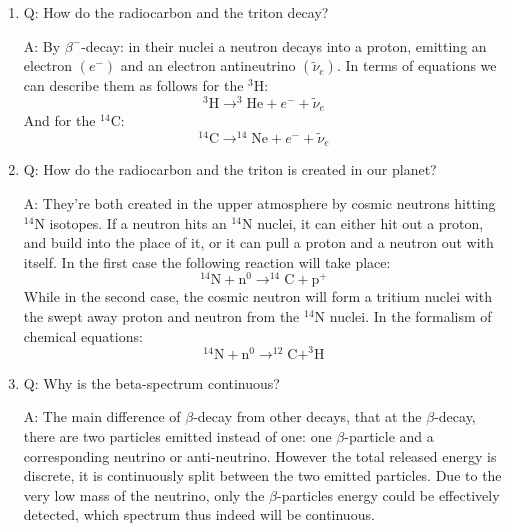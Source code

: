 \begin{enumerate}
    \item Q: How do the radiocarbon and the triton decay?
    \begin{displayquote}
        A: By $\beta^{-}$-decay: in their nuclei a neutron decays into a proton, emitting an electron $\left( e^{-} \right)$ and an electron antineutrino $\left( \tilde{\nu}_{e} \right)$. In terms of equations we can describe them  as follows for the $^{3}$H:
        \begin{equation}
        ^{3}\text{H} \to ^{3}\text{He} + e^{-} + \tilde{\nu}_{e}
        \end{equation}
And for the $^{14}$C:
		\begin{equation}
		^{14}\text{C} \to ^{14}\text{Ne} + e^{-} + \tilde{\nu}_{e}
		\end{equation}
    \end{displayquote}
    
    \item Q: How do the radiocarbon and the triton is created in our planet?
    \begin{displayquote}
        A: They're both created in the upper atmosphere by cosmic neutrons hitting $^{14}$N isotopes. If a neutron hits an $^{14}$N nuclei, it can either hit out a proton, and build into the place of it, or it can pull a proton and a neutron out with itself. In the first case the following reaction will take place:
        \begin{equation}
        ^{14}\text{N} + \text{n}^{0} \to ^{14}\text{C} + \text{p}^{+}
        \end{equation}
While in the second case, the cosmic neutron will form a tritium nuclei with the swept away proton and neutron from the $^{14}$N nuclei. In the formalism of chemical equations:
		\begin{equation}
		^{14}\text{N} + \text{n}^{0} \to ^{12}\text{C} + ^{3}\text{H}
		\end{equation}
    \end{displayquote}
    
    \item Q: Why is the beta-spectrum continuous?
    \begin{displayquote}
        A: The main difference of $\beta$-decay from other decays, that at the $\beta$-decay, there are two particles emitted instead of one: one $\beta$-particle and a corresponding neutrino or anti-neutrino. However the total released energy is discrete, it is continuously split between the two emitted particles. Due to the very low mass of the neutrino, only the $\beta$-particles energy could be effectively detected, which spectrum thus indeed will be continuous.
    \end{displayquote}
    

\end{enumerate}
